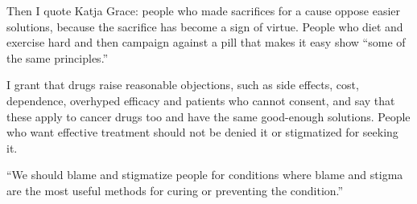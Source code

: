 Then I quote Katja Grace: people who made sacrifices for a cause oppose easier solutions, because the sacrifice has become a sign of virtue. People who diet and exercise hard and then campaign against a pill that makes it easy show ``some of the same principles.'' 

I grant that drugs raise reasonable objections, such as side effects, cost, dependence, overhyped efficacy and patients who cannot consent, and say that these apply to cancer drugs too and have the same good-enough solutions. People who want effective treatment should not be denied it or stigmatized for seeking it.

``We should blame and stigmatize people for conditions where blame and stigma are the most useful methods for curing or preventing the condition.'' 
